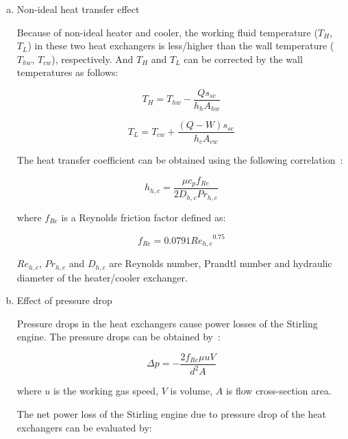 \documentclass[review,3p,10t]{elsarticle}
\begin{document}
\begin{enumerate}[a.]
\item Non-ideal heat transfer effect

Because of non-ideal heater and cooler, the working fluid temperature ($T_{H}$, $T_L$) in these two heat exchangers is less/higher than the wall temperature ($T_{hw}$, $T_{cw}$), respectively. And $T_{H}$ and $T_{L}$ can be corrected by the wall temperatures as follows:

\begin{equation}
	T_H = T_{hw} - \frac{Qs_{se}}{h_hA_{hw}}
	\label{eq:T_H}
\end{equation}

\begin{equation}
	T_L = T_{cw} + \frac{(Q-W)s_{se}}{h_cA_{cw}}
	\label{eq:T_L}
\end{equation}

The heat transfer coefficient can be obtained using the following correlation~\cite{Babaelahi2015}:

\begin{equation}
	h_{h,c} = \frac{\mu c_pf_{Re}}{2D_{h,c}Pr_{h,c}}
\end{equation}

where $f_{Re}$ is a Reynolds friction factor defined as:

\begin{equation}
	f_{Re} = 0.0791{Re_{h,c}}^{0.75}
\end{equation}

$Re_{h,c}$, $Pr_{h,c}$ and $D_{h,c}$ are Reynolds number, Prandtl number and hydraulic diameter of the heater/cooler exchanger.

\item Effect of pressure drop

Pressure drops in the heat exchangers cause power losses of the Stirling engine. The pressure drops can be obtained by~\cite{Urieli1984}:

\begin{equation}
	\Delta p = -\frac{2f_{Re}\mu u V}{d^2A}
\end{equation}

where $u$ is the working gas speed, $V$ is volume, $A$ is flow cross-section area.

The net power loss of the Stirling engine due to pressure drop of the heat exchangers can be evaluated by:


\end{enumerate}
\end{document}
